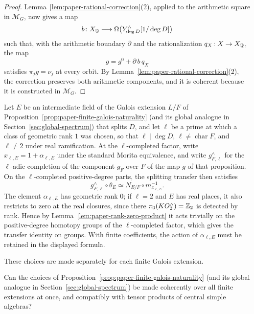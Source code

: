 \begin{proof}
Lemma~\ref{lem:paper-rational-correction}(2), applied to the arithmetic square in $\mathscr M_G$, now gives a map
\[
 b\colon X_\mathbb Q\longrightarrow\Omega\bigl(Y^\wedge_{\deg D}[1/\deg D]\bigr)
\]
such that, with the arithmetic boundary $\partial$ and the rationalization $q_X\colon X\to X_\mathbb Q$, the map
\[
 g=g^0+\partial\,b\,q_X
\]
satisfies $\pi_jg=\nu_j$ at every orbit.
By Lemma~\ref{lem:paper-rational-correction}(2), the correction preserves both arithmetic components, and it is coherent because it is constructed in $\mathscr M_G$.
\end{proof}

\begin{remark}\label{rem:paper-galois-splitting-transfer}
Let $E$ be an intermediate field of the Galois extension $L/F$ of Proposition~\ref{prop:paper-finite-galois-naturality} (and its global analogue in Section~\ref{sec:global-spectrum}) that splits $D$, and let $\ell$ be a prime at which a class of geometric rank $1$ was chosen, so that $\ell\mid\deg D$, $\ell\ne\operatorname{char}F$, and $\ell\ne2$ under real ramification.
At the $\ell$-completed factor, write $x_{\ell,E}=1+\alpha_{\ell,E}$ under the standard Morita equivalence, and write $g_{F,\ell}^{\wedge}$ for the $\ell$-adic completion of the component $g_F$ over $F$ of the map $g$ of that proposition.
On the $\ell$-completed positive-degree parts, the splitting transfer then satisfies
\[
 g_{F,\ell}^{\wedge}\circ\theta_E\simeq N_{E/F}\circ m_{x_{\ell,E}}^{-1}.
\]
The element $\alpha_{\ell,E}$ has geometric rank $0$; if $\ell=2$ and $E$ has real places, it also restricts to zero at the real closures, since there $\pi_0(KO^\wedge_2)=\mathbb Z_2$ is detected by rank.
Hence by Lemma~\ref{lem:paper-rank-zero-product} it acts trivially on the positive-degree homotopy groups of the $\ell$-completed factor, which gives the transfer identity on groups.
With finite coefficients, the action of $\alpha_{\ell,E}$ must be retained in the displayed formula.
\end{remark}

These choices are made separately for each finite Galois extension.

\begin{problem}\label{prob:paper-coherent-choices}
Can the choices of Proposition~\ref{prop:paper-finite-galois-naturality} (and its global analogue in Section~\ref{sec:global-spectrum}) be made coherently over all finite extensions at once, and compatibly with tensor products of central simple algebras?
\end{problem}
